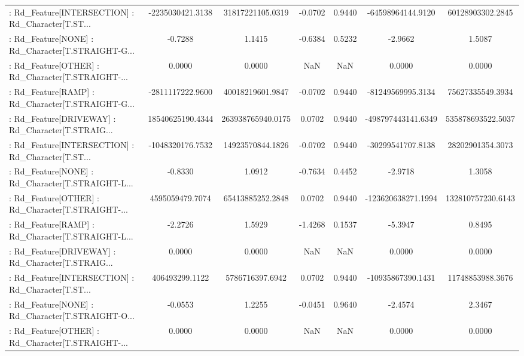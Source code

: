 \begin{longtable}{p{4cm}cccccc}
 : Rd\_Feature[INTERSECTION] : Rd\_Character[T.ST... &  -2235030421.3138 &  31817221105.0319 & -0.0702 &       0.9440 &  -64598964144.9120 &  60128903302.2845 \\
 : Rd\_Feature[NONE] : Rd\_Character[T.STRAIGHT-G... &           -0.7288 &            1.1415 & -0.6384 &       0.5232 &            -2.9662 &            1.5087 \\
 : Rd\_Feature[OTHER] : Rd\_Character[T.STRAIGHT-... &            0.0000 &            0.0000 &     NaN &          NaN &             0.0000 &            0.0000 \\
 : Rd\_Feature[RAMP] : Rd\_Character[T.STRAIGHT-G... &  -2811117222.9600 &  40018219601.9847 & -0.0702 &       0.9440 &  -81249569995.3134 &  75627335549.3934 \\
 : Rd\_Feature[DRIVEWAY] : Rd\_Character[T.STRAIG... &  18540625190.4344 & 263938765940.0175 &  0.0702 &       0.9440 & -498797443141.6349 & 535878693522.5037 \\
 : Rd\_Feature[INTERSECTION] : Rd\_Character[T.ST... &  -1048320176.7532 &  14923570844.1826 & -0.0702 &       0.9440 &  -30299541707.8138 &  28202901354.3073 \\
 : Rd\_Feature[NONE] : Rd\_Character[T.STRAIGHT-L... &           -0.8330 &            1.0912 & -0.7634 &       0.4452 &            -2.9718 &            1.3058 \\
 : Rd\_Feature[OTHER] : Rd\_Character[T.STRAIGHT-... &   4595059479.7074 &  65413885252.2848 &  0.0702 &       0.9440 & -123620638271.1994 & 132810757230.6143 \\
 : Rd\_Feature[RAMP] : Rd\_Character[T.STRAIGHT-L... &           -2.2726 &            1.5929 & -1.4268 &       0.1537 &            -5.3947 &            0.8495 \\
 : Rd\_Feature[DRIVEWAY] : Rd\_Character[T.STRAIG... &            0.0000 &            0.0000 &     NaN &          NaN &             0.0000 &            0.0000 \\
 : Rd\_Feature[INTERSECTION] : Rd\_Character[T.ST... &    406493299.1122 &   5786716397.6942 &  0.0702 &       0.9440 &  -10935867390.1431 &  11748853988.3676 \\
 : Rd\_Feature[NONE] : Rd\_Character[T.STRAIGHT-O... &           -0.0553 &            1.2255 & -0.0451 &       0.9640 &            -2.4574 &            2.3467 \\
 : Rd\_Feature[OTHER] : Rd\_Character[T.STRAIGHT-... &            0.0000 &            0.0000 &     NaN &          NaN &             0.0000 &            0.0000 \\

\end{longtable}
